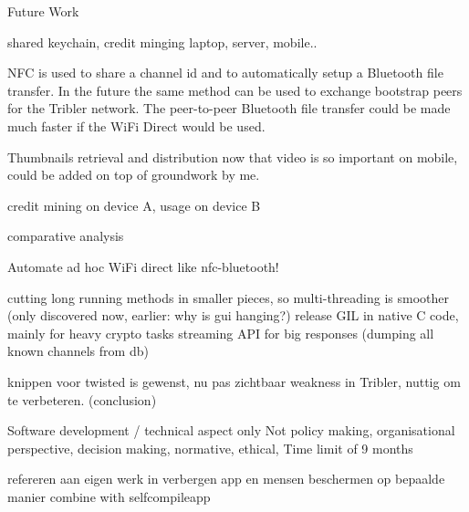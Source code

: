 Future Work


shared keychain, credit minging laptop, server, mobile..


NFC is used to share a channel id and to automatically setup a Bluetooth file transfer.
In the future the same method can be used to exchange bootstrap peers for the Tribler network.
The peer-to-peer Bluetooth file transfer could be made much faster if the WiFi Direct would be used.


Thumbnails retrieval and distribution now that video is so important on mobile, could be added on top of groundwork by me.


credit mining on device A, usage on device B


comparative analysis

Automate ad hoc WiFi direct like nfc-bluetooth!

cutting long running methods in smaller pieces, so multi-threading is smoother (only discovered now, earlier: why is gui hanging?)
release GIL in native C code, mainly for heavy crypto tasks
streaming API for big responses (dumping all known channels from db)

knippen voor twisted is gewenst, nu pas zichtbaar weakness in Tribler, nuttig om te verbeteren. (conclusion)


Software development / technical aspect only
Not policy making, organisational perspective, decision making, normative, ethical,
Time limit of 9 months


refereren aan eigen werk in verbergen app en mensen beschermen op bepaalde manier
combine with selfcompileapp
